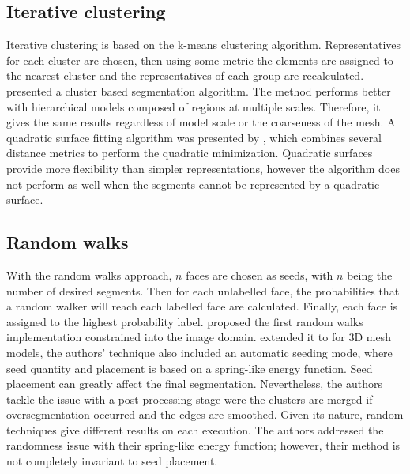 

\subsection{Iterative clustering}

Iterative clustering is based on the k-means clustering algorithm.
Representatives for each cluster are chosen, then using some metric the elements are assigned to the nearest cluster and the representatives of each group are recalculated.
\cite{Lai2006} presented a cluster based segmentation algorithm.
The method performs better with hierarchical models composed of regions at multiple scales.
Therefore, it gives the same results regardless of model scale or the coarseness of the mesh.
A quadratic surface fitting algorithm was presented by \cite{Yan2012}, which combines several distance metrics to perform the quadratic minimization.
Quadratic surfaces provide more flexibility than simpler representations, however the algorithm does not perform as well when the segments 
cannot be represented by a quadratic surface.



\subsection{Random walks}

With the random walks approach, $n$ faces are chosen as seeds, with $n$ being the number of desired segments.
Then for each unlabelled face, the probabilities that a random walker will reach each labelled face are calculated.
Finally, each face is assigned to the highest probability label.
\cite{Grady2006} proposed the first random walks implementation constrained into the image domain.
\cite{Lai2009} extended it to for 3D mesh models, the authors' technique also included an automatic seeding mode, where seed quantity and placement is based on a spring-like energy function.
Seed placement can greatly affect the final segmentation.
Nevertheless, the authors tackle the issue with a post processing stage were the clusters are merged if oversegmentation occurred and the edges are smoothed.
Given its nature, random techniques give different results on each execution. 
The authors addressed the randomness issue with their spring-like energy function; however, their method is not completely invariant to seed placement.
 

